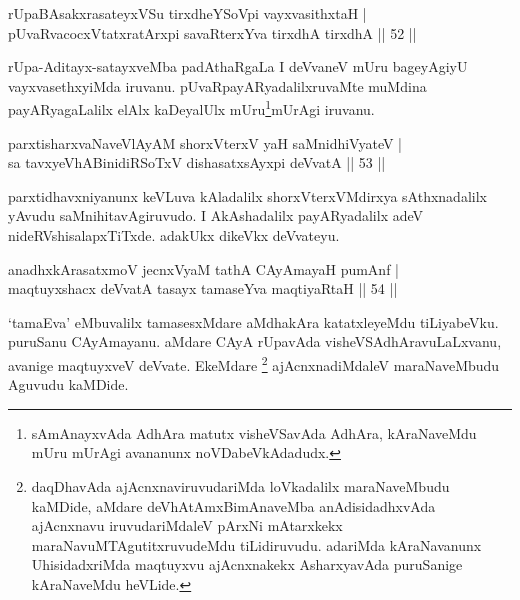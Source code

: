 
\begin{shl}
rUpaBAsakxrasateyxVSu tirxdheYSoV\s pi vayxvasithxtaH |\\
pUvaRvacocxVtatxratArxpi savaRterxYva tirxdhA tirxdhA \hfill || 52 ||
\end{shl}

\begin{artha}
rUpa-Aditayx-satayxveMba padAthaRgaLa I deVvaneV mUru bageyAgiyU vayxvasethxyiMda iruvanu. pUvaRpayARyadalilxruvaMte muMdina payARyagaLalilx elAlx kaDeyalUlx mUru\footnote{sAmAnayxvAda AdhAra matutx visheVSavAda AdhAra, kAraNaveMdu mUru mUrAgi avananunx noVDabeVkAdadudx.}mUrAgi iruvanu.
\end{artha}


\begin{shl}
parxtisharxvaNaveVlAyAM shorxVterxV yaH saMnidhiVyateV |\\
sa tavxyeVhABinidiRSoTxV dishasatxsAyxpi deVvatA \hfill || 53 ||
\end{shl}

\begin{artha}
parxtidhavxniyanunx keVLuva kAladalilx shorxVterxVMdirxya sAthxnadalilx yAvudu saMnihitavAgiruvudo. I AkAshadalilx payARyadalilx adeV nideRVshisalapxTiTxde. adakUkx dikeVkx deVvateyu.
\end{artha}

\begin{shl}
anadhxkArasatxmoV jecnxVyaM tathA CAyAmayaH pumAnf |\\
maqtuyxshacx deVvatA tasayx tamaseYva maqtiyaRtaH \hfill || 54 ||
\end{shl}

\begin{artha}%
`tamaEva' eMbuvalilx tamasesxMdare aMdhakAra katatxleyeMdu tiLiyabeVku. puruSanu CAyAmayanu. aMdare CAyA rUpavAda visheVSAdhAravuLaLxvanu, avanige maqtuyxveV deVvate. EkeMdare \footnote{daqDhavAda ajAcnxnaviruvudariMda loVkadalilx maraNaveMbudu kaMDide, aMdare deVhAtAmxBimAnaveMba anAdisidadhxvAda ajAcnxnavu iruvudariMdaleV pArxNi mAtarxkekx maraNavuMTAgutitxruvudeMdu tiLidiruvudu. adariMda kAraNavanunx UhisidadxriMda maqtuyxvu ajAcnxnakekx AsharxyavAda puruSanige kAraNaveMdu heVLide.} ajAcnxnadiMdaleV maraNaveMbudu Aguvudu kaMDide.
\end{artha}


